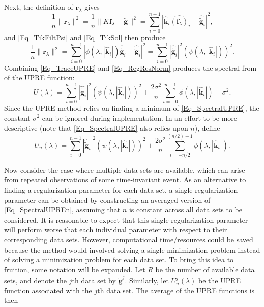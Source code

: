 \documentclass[12pt]{article}
\newcommand{\gnoise}{\widetilde{\mathbf{g}}}
\newcommand{\kdis}{\mathbf{k}}
\newcommand{\kmat}{K}	%
\newcommand{\fdis}{\mathbf{f}}
\newcommand{\regparam}{\lambda}
\newcommand{\freg}{\fdis_{\regparam}}	%
\newcommand{\filt}{\phi}
\newcommand{\mfilt}{\psi}
\newcommand{\noiseSD}{\sigma}	%
\newcommand{\regres}{\mathbf{r}_{\regparam}}	%
\newcommand{\U}{U}	%
\begin{document}
Next, the definition of $\regres$ gives
\[\frac{1}{n}\|\regres\|^2 = \frac{1}{n}\|\kmat\freg - \gnoise\|^2 = \sum_{i = 0}^{n-1} |\widehat{\kdis}_i\widehat{(\freg)}_i - \widehat{\gnoise}_i|^2,\]
and \eqref{Eq_TikFiltPsi} and \eqref{Eq_TikSol} then produce
\begin{equation}
\frac{1}{n}\|\regres\|^2 = \sum_{i = 0}^{n-1} |\filt(\regparam,|\widehat{\kdis}_i|)\widehat{\gnoise}_i - \widehat{\gnoise}_i|^2 = \sum_{i = 0}^{n-1} |\widehat{\gnoise}_i|^2(\mfilt(\regparam,|\widehat{\kdis}_i|))^2.
\label{Eq_RegResNorm}
\end{equation}
Combining \eqref{Eq_TraceUPRE} and \eqref{Eq_RegResNorm} produces the spectral from of the UPRE function:
\begin{equation}
\U(\regparam) = \sum_{i = 0}^{n-1} |\widehat{\gnoise}_i|^2(\mfilt(\regparam,|\widehat{\kdis}_i|))^2 + \frac{2\noiseSD^2}{n}\sum_{i = -0}^{n-1} \filt(\regparam,|\widehat{\kdis}_i|) - \noiseSD^2.
\label{Eq_SpectralUPRE}
\end{equation} 
Since the UPRE method relies on finding a minimum of \eqref{Eq_SpectralUPRE}, the constant $\noiseSD^2$ can be ignored during implementation. In an effort to be more descriptive (note that \eqref{Eq_SpectralUPRE} also relies upon $n$), define
\begin{equation}
\U_n(\regparam) = \sum_{i = 0}^{n-1} |\widehat{\gnoise}_i|^2(\mfilt(\regparam,|\widehat{\kdis}_i|))^2 + \frac{2\noiseSD^2}{n}\sum_{i = -n/2}^{(n/2)-1} \filt(\regparam,|\widehat{\kdis}_i|).
\label{Eq_SpectralUPREn}
\end{equation} \par 
Now consider the case where multiple data sets are available, which can arise from repeated observations of some time-invariant event. As an alternative to finding a regularization parameter for each data set, a single regularization parameter can be obtained by constructing an averaged version of \eqref{Eq_SpectralUPREn}, assuming that $n$ is constant across all data sets to be considered. It is reasonable to expect that this single regularization parameter will perform worse that each individual parameter with respect to their corresponding data sets. However, computational time/resources could be saved because the method would involved solving a single minimization problem instead of solving a minimization problem for each data set. To bring this idea to fruition, some notation will be expanded. Let $R$ be the number of available data sets, and denote the $j$th data set by $\gnoise^j$. Similarly, let $\U_n^j(\regparam)$ be the UPRE function associated with the $j$th data set.  The average of the UPRE functions is then 
\end{document}
